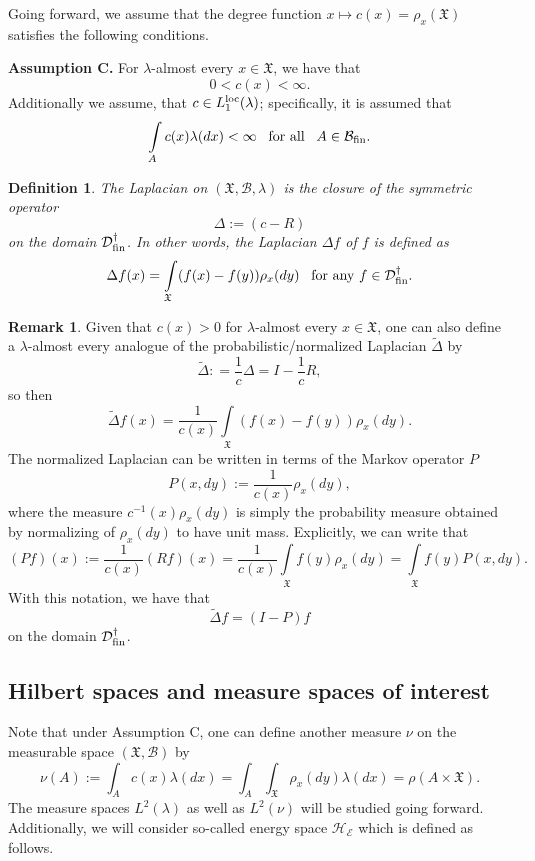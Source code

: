 \documentclass[11pt,reqno]{amsart}
\newtheorem{definition}[theorem]{Definition}
\theoremstyle{remark}
\theoremstyle{definition}
\newtheorem{remark}{Remark}
\numberwithin{theorem}{section} \numberwithin{equation}{section}
\newcommand{\D}{\mathcal{D}}
\newcommand{\HE}{\mathcal{H}_\mathcal{E}}
\newcommand{\X}{\mathfrak{X}}
\begin{document}
Going forward, we
assume that the degree function $x\mapsto c(x)=\rho_x(\X)$  satisfies the following conditions.

\medskip
\textbf{Assumption C.} For $\lambda$-almost every $x \in \X$, we have that
$$
 0<c(x)<\infty.
$$
Additionally we assume, that $c\in L_1^{\rm loc}(\lambda)$;  specifically, it is assumed that
$$
\int\limits_A c(x)\lambda(dx)< \infty
\,\,\,\,\,
\text{\rm for all}
\,\,\,\,\,
A\in \mathcal{B}_{\rm fin}.
$$

\begin{definition}\label{def:Laplacian}
   The Laplacian on $(\X, \mathcal{B},\lambda)$ is the closure of the symmetric operator
   $$
   \Delta :=(c-R)
   $$
   on the domain $\D_{\rm fin}^{\dagger}$. In other words, the Laplacian $\Delta f$ of $f$ is
   defined as
 $$
 \Delta f(x)= \int\limits_{\X}(f(x)-f(y))\rho_x(dy)
\,\,\,\,\,
\text{\rm for any $f \in \D_{\rm fin}^{\dagger}$.}
$$
\end{definition}


\begin{remark}
Given that $c(x)>0$ for  $\lambda$-almost every $x\in\X$,
one can also define a $\lambda$-almost every analogue of the probabilistic/normalized Laplacian $\tilde \Delta$ by
$$
\tilde \Delta: = \frac{1}{c}\Delta = I - \frac{1}{c}{R},
$$
so then
$$
\tilde \Delta f(x)=\frac{1}{c(x)} \int\limits_{\X}(f(x)-f(y))\rho_x(dy).
$$
The normalized Laplacian can be written in terms of the Markov operator $P$
$$
P(x,dy):= \frac{1}{c(x)} \rho_x(dy),
$$
where the measure $c^{-1}(x) \rho_x(dy)$
is simply the probability measure obtained by normalizing of $\rho_x(dy)$ to have unit mass.   Explicitly, we can write that
$$
(Pf)(x):=\frac{1}{c(x)}(Rf)(x)=\frac{1}{c(x)}\int\limits_{\X}f(y)\rho_x(dy)=
\int\limits_{\X}f(y)P(x,dy).
$$
With this notation, we have that
$$
\tilde \Delta f=(I-P)f
$$
on the domain $\D_{\rm fin}^{\dagger}$.
\end{remark}

\medskip
\subsection{Hilbert spaces and measure spaces of interest}
Note that under Assumption C, one can define another measure $\nu$ on the measurable space $(\X,\mathcal{B})$ by
\begin{equation} \label{eq. nu defn}
\nu(A):=\int_A c(x)\lambda(dx)=\int_A \int_\X\rho_x(dy)\lambda(dx)=\rho(A\times \X).
\end{equation}
The measure spaces  $L^{2}(\lambda)$ as well as $L^{2}(\nu)$ will be studied going forward.
Additionally, we will consider so-called energy space $\HE$ which is defined as follows.
\end{document}
